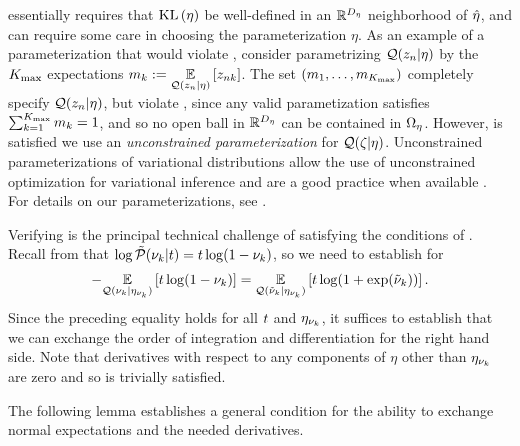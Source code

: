  essentially requires that $\mathrm{KL}\left(\eta\right)$
be well-defined in an $\mathbb{R}^{D_{\eta}}$ neighborhood of $\hat\eta$, and can
require some care in choosing the parameterization $\eta$.  As an example of a
parameterization that would violate ,
consider parametrizing $\mathcal{Q}(z_{n} \vert \eta)$ by the ${K_{\mathrm{max}}}$ expectations
$m_k := \underset{\mathcal{Q}(z_{n} \vert \eta)}{\mathbb{E}}\left[z_{nk}\right]$.  The set $(m_1, \ldots,
m_{K_{\mathrm{max}}})$ completely specify $\mathcal{Q}(z_{n} \vert \eta)$, but violate
, since any valid parametization
satisfies $\sum_{k=1}^{K_{\mathrm{max}}} m_k = 1$, and so no open ball in
$\mathbb{R}^{D_{\eta}}$ can be contained in $\Omega_{\eta}$.  However,
 is satisfied we use an {\em
unconstrained parameterization} for $\mathcal{Q}(\zeta \vert \eta)$.   Unconstrained
parameterizations of variational distributions allow the use of unconstrained
optimization for variational inference and are a good practice when available
\citep{kucukelbir:2016:advi}.  For details on our parameterizations, see
.

Verifying  is the principal technical challenge of
satisfying the conditions of . Recall from
 that $\log \tilde{\mathcal{P}}(\nu_{k} \vert t) = t \log (1 - \nu_{k})$,
so we need to establish  for
%
\begin{align*}
%
-\expect{\q(\nuk \vert \etanuk)}{t \log (1 - \nuk)} =
\expect{\q(\lnuk \vert \etanuk)}
      {t \log (1 + \exp(\lnuk))}.
%
\end{align*}
%
Since the preceding equality holds for all $t$ and $\eta_{\nu_{k}}$, it suffices to
establish that we can exchange the order of integration and differentiation for
the right hand side.  Note that derivatives with respect to any components of
$\eta$ other than $\eta_{\nu_{k}}$ are zero and so  is
trivially satisfied.

The following lemma establishes a general condition for the ability
to exchange normal expectations and the needed derivatives.



